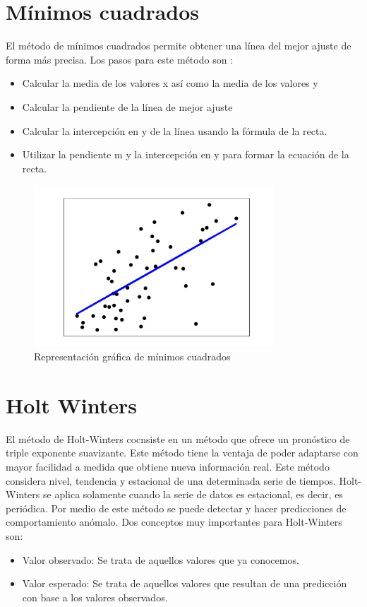 \section{Mínimos cuadrados}
El método de mínimos cuadrados permite obtener una línea del mejor ajuste de forma más precisa.
\newline
Los pasos para este método son \cite{MinimosCuadrados}:
\begin{itemize}
    \item Calcular la media de los valores x así como la media de los valores y
    \item Calcular la pendiente de la línea de mejor ajuste
    \item Calcular la intercepción en y de la línea usando la fórmula de la recta.
    \item Utilizar la pendiente m y la intercepción en y para formar la ecuación de la recta.
\end{itemize}
\begin{figure}[H]
\vspace{1cm}
\centering
\includegraphics[width=0.8\textwidth]{imagenes/minimoscuadrados.png}
\caption{Representación gráfica de mínimos cuadrados}
\end{figure}

\section{Holt Winters}
El método de Holt-Winters cocnsiste en un método que ofrece un pronóstico de triple exponente suavizante. Este método tiene la ventaja de poder adaptarse con mayor facilidad a medida que obtiene nueva información real. 
\newline
Este método considera nivel, tendencia y estacional de una determinada serie de tiempos.
\newline
Holt-Winters se aplica solamente cuando la serie de datos es estacional, es decir, es periódica. 
\newline
Por medio de este método se puede detectar y hacer predicciones de comportamiento anómalo\cite{HoltWinters}. 
\newline
Dos conceptos muy importantes para Holt-Winters son:
\begin{itemize}
    \item Valor observado: Se trata de aquellos valores que ya conocemos.
    \item Valor esperado: Se trata de aquellos valores que resultan de una predicción con base a los valores observados.
\end{itemize}

